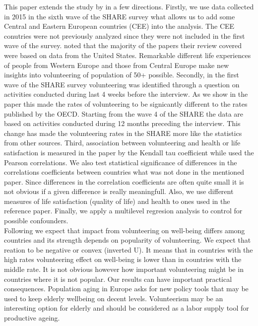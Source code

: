 \documentclass[10pt, letterpaper]{article}
\begin{document}
\begin{spacing}{1.4}
This paper extends the study by \citet{haski09} in a few directions. Firstly, we use data collected in 2015 in the sixth wave of the SHARE survey what allows us to add some Central and Eastern European countries (CEE) into the analysis. The CEE conutries were not previously analyzed since they were not included in the first wave of the survey.  \citep{casiday08} noted that the majority of the papers their review covered were based on data from the United States. Remarkable different life experiences of people from Western Europe and those from Central Europe make new insights into volunteering of population of 50+ possible.  Secondly, in the first wave of the SHARE survey volunteering was identified through a question on activities conducted during last 4 weeks before the interview. As we show in the paper this made the rates of volunteering to be signicantly different to the rates published by the OECD. Starting from the wave 4 of the SHARE the data are based on activities conducted during 12 months preceding the interview. This change has made the volunteering rates in the SHARE more like the statistics from other sources.  Third, association between volunteering and health or life satisfaction is measured in the paper by the Kendall tau coefficient while \citet{haski09} used the Pearson correlations. We also test statistical significance of differences in the correlations coefficients between countries what was not done in the mentioned paper.  Since differences in the correlation coefficients are often quite small it is not obvious if a given difference is really meaningfull. Also, we use different measures of life satisfaction (quality of life) and health to ones used in the reference paper. Finally, we apply a multilevel regresion analysis to control for possible confounders.  \\

Following \citet{haski09} we expect that impact from volunteering on well-being differs among countries and its strength depends on popularity of volunteering. We expect that reation to be negative or convex (inverted U). It means that in countries with the high rates volunteering effect on well-being is lower than in countries with the middle rate. It is not obvious however how important  volunteering might be in countries where it is not popular. Our results can have important practical consequences. Population aging in Europe asks for new policy tools that may be used to keep elderly wellbeing on decent levels. Volunteerism may be an interesting option for elderly and should be considered as a labor supply tool for productive ageing. 
 



\end{spacing}
\end{document}
